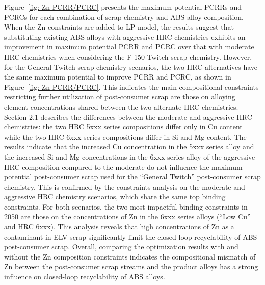 Figure~\ref{fig: Zn PCRR/PCRC} presents the maximum potential PCRRs and PCRCs for each combination of scrap chemistry and ABS alloy composition. When the Zn constraints are added to LP model, the results suggest that substituting existing ABS alloys with aggressive HRC chemistries exhibits an improvement in maximum potential PCRR and PCRC over that with moderate HRC chemistries when considering the F-150 Twitch scrap chemistry. However, for the General Twitch scrap chemistry scenarios, the two HRC alternatives have the same maximum potential to improve PCRR and PCRC, as shown in Figure~\ref{fig: Zn PCRR/PCRC}. This indicates the main compositional constraints restricting further utilization of post-consumer scrap are those on alloying element concentrations shared between the two alternate HRC chemistries. Section 2.1 describes the differences between the moderate and aggressive HRC chemistries: the two HRC 5xxx series compositions differ only in Cu content while the two HRC 6xxx series compositions differ in Si and Mg content. The results indicate that the increased Cu concentration in the 5xxx series alloy and the increased Si and Mg concentrations in the 6xxx series alloy of the aggressive HRC composition compared to the moderate do not influence the maximum potential post-consumer scrap used for the ``General Twitch'' post-consumer scrap chemistry. This is confirmed by the constraints analysis on the moderate and aggressive HRC chemistry scenarios, which share the same top binding constraints. For both scenarios, the two most impactful binding constraints in 2050 are those on the concentrations of Zn in the 6xxx series alloys (``Low Cu'' and HRC 6xxx). This analysis reveals that high concentrations of Zn as a contaminant in ELV scrap significantly limit the closed-loop recyclability of ABS post-consumer scrap. Overall, comparing the optimization results with and without the Zn composition constraints indicates the compositional mismatch of Zn between the post-consumer scrap streams and the product alloys has a strong influence on closed-loop recyclability of ABS alloys. 


